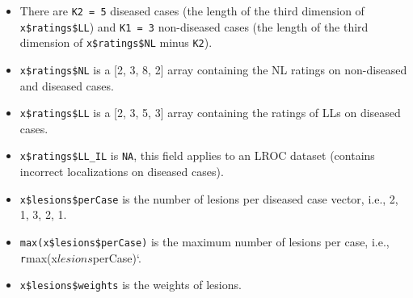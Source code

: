 \documentclass[
]{book}
\newenvironment{Shaded}{\begin{snugshade}}{\end{snugshade}}
\newcommand{\CommentTok}[1]{\textcolor[rgb]{0.56,0.35,0.01}{\textit{#1}}}
\newcommand{\KeywordTok}[1]{\textcolor[rgb]{0.13,0.29,0.53}{\textbf{#1}}}
\newcommand{\NormalTok}[1]{#1}
\newcommand{\OperatorTok}[1]{\textcolor[rgb]{0.81,0.36,0.00}{\textbf{#1}}}
\providecommand{\tightlist}{%
  \setlength{\itemsep}{0pt}\setlength{\parskip}{0pt}}
\begin{document}
\begin{itemize}
\tightlist
\item
  There are \texttt{K2\ =\ 5} diseased cases (the length of the third dimension of \texttt{x\$ratings\$LL}) and \texttt{K1\ =\ 3} non-diseased cases (the length of the third dimension of \texttt{x\$ratings\$NL} minus \texttt{K2}).
\item
  \texttt{x\$ratings\$NL} is a {[}2, 3, 8, 2{]} array containing the NL ratings on non-diseased and diseased cases.
\item
  \texttt{x\$ratings\$LL} is a {[}2, 3, 5, 3{]} array containing the ratings of LLs on diseased cases.
\item
  \texttt{x\$ratings\$LL\_IL} is \texttt{NA}, this field applies to an LROC dataset (contains incorrect localizations on diseased cases).
\end{itemize}

\begin{Shaded}
\end{Shaded}

\begin{itemize}
\tightlist
\item
  \texttt{x\$lesions\$perCase} is the number of lesions per diseased case vector, i.e., 2, 1, 3, 2, 1.
\item
  \texttt{max(x\$lesions\$perCase)} is the maximum number of lesions per case, i.e., \texttt{r}max(x\(lesions\)perCase)`.
\item
  \texttt{x\$lesions\$weights} is the weights of lesions.
\end{itemize}

\begin{Shaded}
\end{Shaded}
\end{document}
